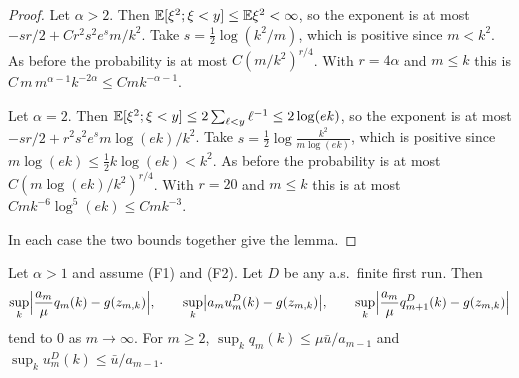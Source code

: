 \begin{proof}
Let $\alpha>2$. Then $\mathbb{E}[\xi^2;\xi<y]\le\mathbb{E}\xi^2<\infty$, so the exponent is at most
$-sr/2+Cr^2s^2e^sm/k^2$. Take $s=\frac12\log(k^2/m)$, which is positive since $m<k^2$.
As before the probability is at most $C(m/k^2)^{r/4}$. With $r=4\alpha$ and $m\le k$
this is $C\,m\,m^{\alpha-1}k^{-2\alpha}\le Cmk^{-\alpha-1}$.

Let $\alpha=2$. Then $\mathbb{E}[\xi^2;\xi<y]\le2\sum_{\ell<y}\ell^{-1}\le2\log(ek)$, so the
exponent is at most $-sr/2+r^2s^2e^sm\log(ek)/k^2$. Take
$s=\frac12\log\frac{k^2}{m\log(ek)}$, which is positive since
$m\log(ek)\le\frac12k\log(ek)<k^2$. As before the probability is at most
$C(m\log(ek)/k^2)^{r/4}$. With $r=20$ and $m\le k$ this is at most
$Cmk^{-6}\log^5(ek)\le Cmk^{-3}$.

In each case the two bounds together give the lemma.
\end{proof}

\begin{lemma}\label{lem:C-firstpassage}
Let $\alpha>1$ and assume \textup{(F1)} and \textup{(F2)}. Let $D$ be any a.s.\ finite
first run. Then
\[
\sup_k\Bigl\lvert\frac{a_m}\mu q_m(k)-g(z_{m,k})\Bigr\rvert,\qquad
\sup_k\bigl\lvert a_mu^D_m(k)-g(z_{m,k})\bigr\rvert,\qquad
\sup_k\Bigl\lvert\frac{a_m}\mu q^D_{m+1}(k)-g(z_{m,k})\Bigr\rvert
\]
tend to $0$ as $m\to\infty$. For $m\ge2$, $\sup_kq_m(k)\le\mu \bar u/a_{m-1}$ and
$\sup_ku^D_m(k)\le \bar u/a_{m-1}$.
\end{lemma}

